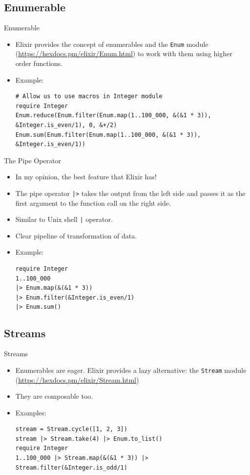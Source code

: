\documentclass[12pt]{beamer}
\begin{document}
\subsection{Enumerable}
\begin{frame}[fragile]{Enumerable}
  \begin{itemize}
    \item Elixir provides the concept of enumerables and the \texttt{Enum} module (\url{https://hexdocs.pm/elixir/Enum.html}) to work with them using higher order functions.
    \item Example:
          \begin{verbatim}
# Allow us to use macros in Integer module
require Integer
Enum.reduce(Enum.filter(Enum.map(1..100_000, &(&1 * 3)), &Integer.is_even/1), 0, &+/2)
Enum.sum(Enum.filter(Enum.map(1..100_000, &(&1 * 3)), &Integer.is_even/1))
  \end{verbatim}
  \end{itemize}
\end{frame}

\begin{frame}[fragile]{The Pipe Operator}
  \begin{itemize}
    \item In my opinion, the best feature that Elixir has!
    \item The pipe operator \texttt{|>} takes the output from the left side and passes it as the first argument to the function call on the right side.
    \item Similar to Unix shell \texttt{|} operator.
    \item Clear pipeline of transformation of data.
    \item Example:
          \begin{verbatim}
require Integer
1..100_000
|> Enum.map(&(&1 * 3))
|> Enum.filter(&Integer.is_even/1)
|> Enum.sum()
  \end{verbatim}
  \end{itemize}
\end{frame}

\subsection{Streams}
\begin{frame}[fragile]{Streams}
  \begin{itemize}
    \item Enumerables are eager. Elixir provides a lazy alternative: the \texttt{Stream} module (\url{https://hexdocs.pm/elixir/Stream.html})
    \item They are composable too.
    \item Examples:
          \begin{verbatim}
stream = Stream.cycle([1, 2, 3])
stream |> Stream.take(4) |> Enum.to_list()
require Integer
1..100_000 |> Stream.map(&(&1 * 3)) |> Stream.filter(&Integer.is_odd/1)
  \end{verbatim}
  \end{itemize}
\end{frame}
\end{document}
